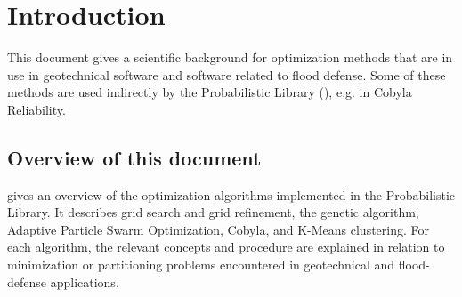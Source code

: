\chapter{Introduction}

This document gives a scientific background for optimization methods that are in use in geotechnical software
and software related to flood defense.
Some of these methods are used indirectly by the Probabilistic Library (\cite{scientific_background_probLib}),
e.g. in Cobyla Reliability.

\section{Overview of this document}

 gives an overview of the optimization algorithms implemented in the Probabilistic Library.
It describes grid search and grid refinement, the genetic algorithm, Adaptive Particle Swarm Optimization, Cobyla, and K-Means clustering.
For each algorithm, the relevant concepts and procedure are explained in relation to minimization or partitioning problems encountered in geotechnical and flood-defense applications.
